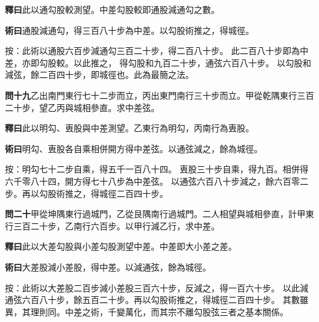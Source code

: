 \documentclass[12pt,a4paper]{article}
\begin{document}
\noindent\textbf{釋曰}\quad 此以通勾股較測望。中差勾股較即通股減通勾之數。

\vspace{0.3em}

\noindent\textbf{術曰}\quad 通股減通勾，得三百八十步為中差。以勾股術推之，得城徑。

\vspace{0.3em}

\noindent
按：此術以通股六百步減通勾三百二十步，得二百八十步。
此二百八十步即為中差，亦即勾股較。以此推之，
得勾股和九百二十步，通弦六百八十步。
以勾股和減弦，餘二百四十步，即城徑也。此為最簡之法。

\vspace{0.5em}

\noindent\textbf{問十九}\quad 乙出南門東行七十二步而立，丙出東門南行三十步而立。甲從乾隅東行三百二十步，望乙丙與城相參直。求中差弦。

\vspace{0.3em}

\noindent\textbf{釋曰}\quad 此以明勾、叀股與中差測望。乙東行為明勾，丙南行為叀股。

\vspace{0.3em}

\noindent\textbf{術曰}\quad 明勾、叀股各自乘相併開方得中差弦。以通弦減之，餘為城徑。

\vspace{0.3em}

\noindent
按：明勾七十二步自乘，得五千一百八十四。
叀股三十步自乘，得九百。相併得六千零八十四，開方得七十八步為中差弦。
以通弦六百八十步減之，餘六百零二步。再以勾股術推之，得城徑二百四十步。

\vspace{0.5em}

\noindent\textbf{問二十}\quad 甲從坤隅東行過城門，乙從艮隅南行過城門。二人相望與城相參直，計甲東行三百二十步，乙南行六百步。以甲行減乙行，求中差。

\vspace{0.3em}

\noindent\textbf{釋曰}\quad 此以大差勾股與小差勾股測望中差。中差即大小差之差。

\vspace{0.3em}

\noindent\textbf{術曰}\quad 大差股減小差股，得中差。以減通弦，餘為城徑。

\vspace{0.3em}

\noindent
按：此術以大差股二百步減小差股三百六十步，反減之，得一百六十步。
以此減通弦六百八十步，餘五百二十步。再以勾股術推之，得城徑二百四十步。
其數雖異，其理則同。中差之術，千變萬化，而其宗不離勾股弦三者之基本關係。
\end{document}
